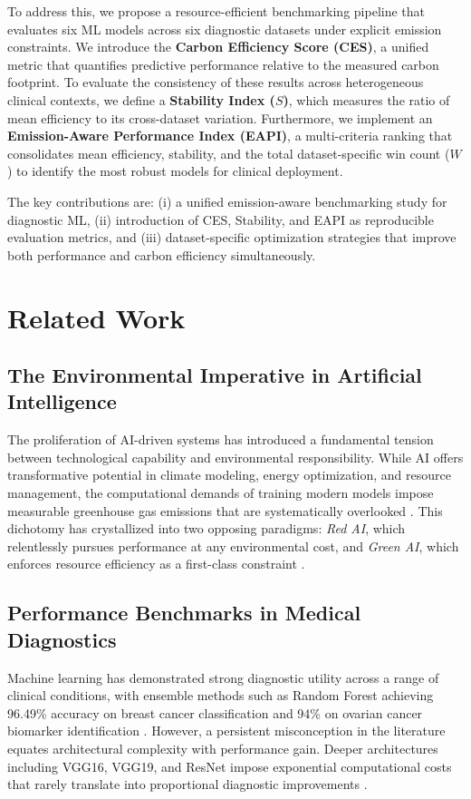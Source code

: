 \documentclass[conference]{IEEEtran}
\begin{document}
To address this, we propose a resource-efficient benchmarking pipeline that evaluates six ML models across six diagnostic datasets under explicit emission constraints. We introduce the \textbf{Carbon Efficiency Score (CES)}, a unified metric that quantifies predictive performance relative to the measured carbon footprint. To evaluate the consistency of these results across heterogeneous clinical contexts, we define a \textbf{Stability Index ($S$)}, which measures the ratio of mean efficiency to its cross-dataset variation. Furthermore, we implement an \textbf{Emission-Aware Performance Index (EAPI)}, a multi-criteria ranking that consolidates mean efficiency, stability, and the total dataset-specific win count (\(W\)) to identify the most robust models for clinical deployment.

The key contributions are: (i) a unified emission-aware benchmarking study for diagnostic ML, (ii) introduction of CES, Stability, and EAPI as reproducible evaluation metrics, and (iii) dataset-specific optimization strategies that improve both performance and carbon efficiency simultaneously.
\vspace{0ex}
\section{Related Work}

\subsection{The Environmental Imperative in Artificial Intelligence}
The proliferation of AI-driven systems has introduced a fundamental tension 
between technological capability and environmental responsibility. While AI 
offers transformative potential in climate modeling, energy optimization, and 
resource management, the computational demands of training modern models 
impose measurable greenhouse gas emissions that are systematically overlooked 
\cite{b3}. This dichotomy has crystallized into two opposing paradigms: 
\textit{Red AI}, which relentlessly pursues performance at any environmental 
cost, and \textit{Green AI}, which enforces resource efficiency as a first-class 
constraint \cite{b3}.

\subsection{Performance Benchmarks in Medical Diagnostics}
Machine learning has demonstrated strong diagnostic utility across a range of 
clinical conditions, with ensemble methods such as Random Forest achieving 
96.49\% accuracy on breast cancer classification and 94\% on ovarian cancer 
biomarker identification \cite{b2}. However, a persistent misconception in 
the literature equates architectural complexity with performance gain. Deeper 
architectures including VGG16, VGG19, and ResNet impose exponential 
computational costs that rarely translate into proportional diagnostic 
improvements \cite{b3}.
\end{document}
